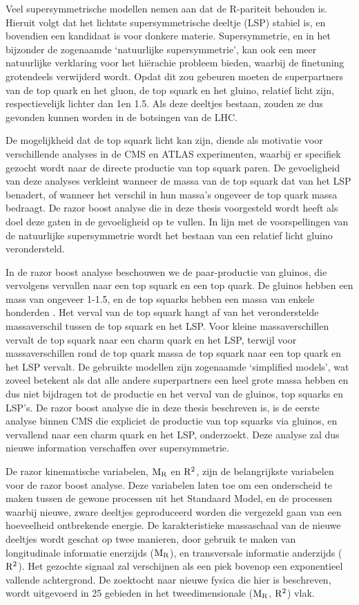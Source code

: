 Veel supersymmetrische modellen nemen aan dat de R-pariteit behouden is. Hieruit volgt dat het
lichtste supersymmetrische deeltje (LSP) stabiel is, en bovendien een kandidaat is voor donkere
materie. Supersymmetrie, en in het bijzonder de zogenaamde `natuurlijke supersymmetrie', kan ook
een meer natuurlijke verklaring voor het hi\"erachie probleem bieden, waarbij de finetuning
grotendeels verwijderd wordt. Opdat dit zou gebeuren moeten de superpartners van de top quark en het
gluon, de top squark en het gluino, relatief licht zijn, respectievelijk lichter dan 1\TeV en
1.5\TeV. Als deze deeltjes bestaan, zouden ze dus gevonden kunnen worden in de botsingen van de
LHC. 

De mogelijkheid dat de top squark licht kan zijn, diende als motivatie voor verschillende analyses
in de CMS en ATLAS experimenten, waarbij er specifiek gezocht wordt naar de directe productie van
top squark paren. De gevoeligheid van deze analyses verkleint wanneer de massa van de top squark
dat van het LSP benadert, of wanneer het verschil in hun massa's ongeveer de top quark massa
bedraagt. De razor boost analyse die in deze thesis voorgesteld wordt heeft als doel deze gaten in
de gevoeligheid op te vullen. In lijn met de voorspellingen van de natuurlijke supersymmetrie wordt
het bestaan van een relatief licht gluino verondersteld. 

In de razor boost analyse beschouwen we de paar-productie van gluinos, die vervolgens vervallen
naar een top squark en een top quark. De gluinos hebben een mass van ongeveer 1-1.5\TeV, en de top
squarks hebben een massa van enkele honderden \GeV. Het verval van de top squark hangt af van het
veronderstelde massaverschil tussen de top squark en het LSP. Voor kleine massaverschillen vervalt
de top squark naar een charm quark en het LSP, terwijl voor massaverschillen rond de top quark
massa de top squark naar een top quark en het LSP vervalt. De gebruikte modellen zijn zogenaamde
`simplified models', wat zoveel betekent als dat alle andere superpartners een heel grote massa
hebben en dus niet bijdragen tot de productie en het verval van de gluinos, top squarks en LSP's.
De razor boost analyse die in deze thesis beschreven is, is de eerste analyse binnen CMS die
expliciet de productie van top squarks via gluinos, en vervallend naar een charm quark en het LSP,
onderzoekt. Deze analyse zal dus nieuwe information verschaffen over supersymmetrie. 

De razor kinematische variabelen, $\mathrm{M_R}$ en $\mathrm{R^2}$, zijn de belangrijkste variabelen voor de
razor boost analyse. Deze variabelen laten toe om een onderscheid te maken tussen de gewone
processen uit het Standaard Model, en de processen waarbij nieuwe, zware deeltjes geproduceerd
worden die vergezeld gaan van een hoeveelheid ontbrekende energie. De karakteristieke massaschaal
van de nieuwe deeltjes wordt geschat op twee manieren, door gebruik te maken van longitudinale
informatie enerzijds ($\mathrm{M_R}$), en transversale informatie anderzijds ($\mathrm{R^2}$). Het gezochte signaal
zal verschijnen als een piek bovenop een exponentieel vallende achtergrond. De zoektocht naar
nieuwe fysica die hier is beschreven, wordt uitgevoerd in 25 gebieden in het tweedimensionale
($\mathrm{M_R}$, $\mathrm{R^2}$) vlak. 

